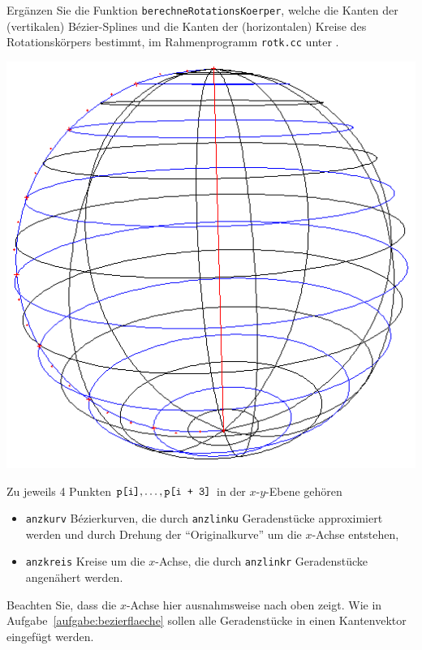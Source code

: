 \label{aufgabe:rotk}
%
Ergänzen Sie die Funktion \texttt{berechneRotationsKoerper}, welche die
Kanten der (vertikalen) B\'{e}zier-Splines und die Kanten der (horizontalen)
Kreise des Rotationskörpers bestimmt, im Rahmenprogramm \texttt{rotk.cc}
unter .

\begin{center}
  \includegraphics*[scale=0.5]{rotkBsp.png}    
\end{center}

Zu jeweils 4 Punkten
$\text{\texttt{p[i]}}, \ldots, \text{\texttt{p[i + 3]}}$ in der
$x$-$y$-Ebene gehören
\begin{itemize}
  \item \texttt{anzkurv} Bézierkurven, die durch \texttt{anzlinku}
        Geradenstücke approximiert werden und durch Drehung der
        "`Originalkurve"' um die $x$-Achse entstehen,
  \item \texttt{anzkreis} Kreise um die $x$-Achse, die durch
        \texttt{anzlinkr} Geradenstücke angenähert werden.
\end{itemize}
Beachten Sie, dass die $x$-Achse hier ausnahmsweise nach oben zeigt. Wie 
in Aufgabe~\ref{aufgabe:bezierflaeche} sollen alle Geradenstücke in 
einen Kantenvektor eingefügt werden.
